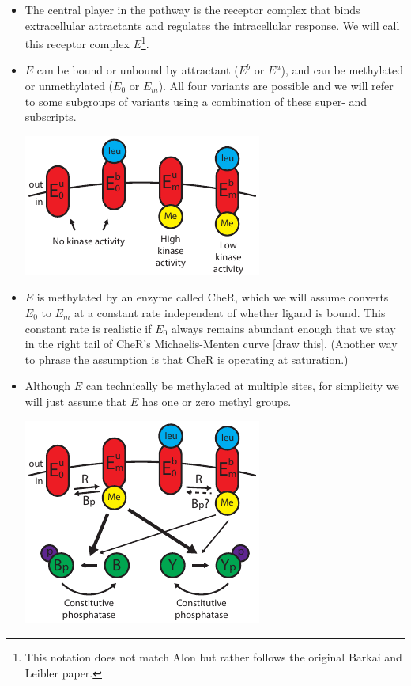 \documentclass{article}
\begin{document}
\begin{itemize}
\item The central player in the pathway is the receptor complex that binds extracellular attractants and regulates the intracellular response. We will call this receptor complex $E$\footnote{This notation does not match Alon but rather follows the original Barkai and Leibler paper.}.
\item $E$ can be bound or unbound by attractant ($E^b$ or $E^u$), and can be methylated or unmethylated ($E_0$ or $E_m$). All four variants are possible and we will refer to some subgroups of variants using a combination of these super- and subscripts.

\begin{center}\includegraphics[width=.5\textwidth]{receptornotation.pdf}\end{center}

\item $E$ is methylated by an enzyme called CheR, which we will assume converts $E_0$ to $E_m$ at a constant rate independent of whether ligand is bound. This constant rate is realistic if $E_0$ always remains abundant enough that we stay in the right tail of CheR's Michaelis-Menten curve [draw this]. (Another way to phrase the assumption is that CheR is \textrm{operating at saturation}.)
\item Although $E$ can technically be methylated at multiple sites, for simplicity we will just assume that $E$ has one or zero methyl groups.

\begin{center}\includegraphics[width=.5\textwidth]{receptormethylation.pdf}\end{center}


\end{itemize}
\end{document}
